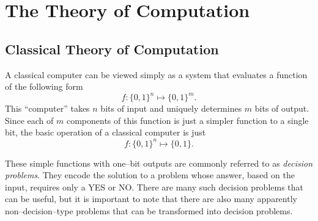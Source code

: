
\section{The Theory of Computation}


\subsection{Classical Theory of Computation}
\label{ssec:classicalComp}

A classical computer can be viewed simply as a
system that evaluates a function of the following
form
\begin{equation}
f\colon\lbrace 0,1\rbrace^n \mapsto \lbrace 0,1\rbrace^m.
\end{equation}
This ``computer'' takes $n$ bits of input and uniquely
determines $m$ bits of output.
Since each of $m$ components of this function is just a 
simpler function to a single bit,
the basic operation of a classical computer is just 
\begin{equation}
f\colon\lbrace 0,1\rbrace^n \mapsto \lbrace 0,1\rbrace.
\end{equation}

These simple functions with one--bit outputs are commonly
referred to as \emph{decision problems}.
They encode the solution to a problem whose answer, based on
the input, requires only a YES or NO.  There are many such
decision problems that can be useful, but it is important to note
that there are also many apparently non--decision--type problems 
that can be transformed into decision problems.  


